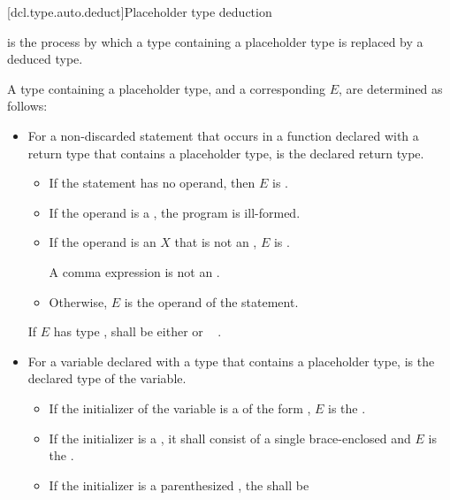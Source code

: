 [dcl.type.auto.deduct]{Placeholder type deduction}
%

\pnum
{}
is the process by which
a type containing a placeholder type
is replaced by a deduced type.

\pnum
A type  containing a placeholder type,
and a corresponding  $E$,
are determined as follows:
\begin{itemize}
\item
For a non-discarded  statement that occurs
in a function declared with a return type
that contains a placeholder type,
 is the declared return type.
\begin{itemize}
\item
If the  statement has no operand,
then $E$ is .
\item
If the operand is a ,
the program is ill-formed.
\item
If the operand is an  $X$
that is not an ,
$E$ is .
\begin{note}
A comma expression is not
an .
\end{note}
\item
Otherwise, $E$ is the operand of the  statement.
\end{itemize}
If $E$ has type ,
 shall be either
  or
\cv{}~ .
\item
For a variable declared with a type
that contains a placeholder type,
 is the declared type of the variable.
\begin{itemize}
\item
If the initializer of the variable is a 
of the form ,
$E$ is the .
\item
If the initializer is a ,
it shall consist of a single brace-enclosed 
and $E$ is the .
\item
If the initializer is a parenthesized ,
the  shall be

\end{itemize}
\end{itemize}

